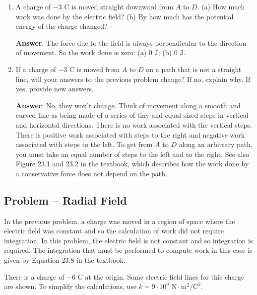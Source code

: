 \documentclass{article}
\begin{document}
\begin{enumerate}
        \vskip 48pt
        \fi

  \item A charge of $-3\text{ C}$ is moved straight downward from $A$ to $D$. (a) How much work was done by the electric field? (b) By how much has the potential energy of the charge changed?

        \ifsolutions
        {\bf Answer}: The force due to the field is always perpendicular to the direction of movement. So the work done is zero: (a) $0\text{ J}$; (b) $0 \text{ J}$.
        \else

        \vskip 48pt
        \fi

  \item If a charge of $-3\text{ C}$ is moved from $A$ to $D$ on a path that is not a straight line, will your answers to the previous problem change? If no, explain why. If yes, provide new answers.

        \ifsolutions
        {\bf Answer}: No, they won't change. Think of movement along a smooth and curved line as being made of a series of tiny and equal-sized steps in vertical and horizontal directions. There is no work associated with the vertical steps. There is positive work associated with steps to the right and negative work associated with steps to the left. To get from $A$ to $D$ along an arbitrary path, you must take an equal number of steps to the left and to the right. See also Figure 23.1 and 23.2 in the textbook, which describes how the work done by a conservative force does not depend on the path.
        \else

        \vskip 36pt
        \fi

\end{enumerate}

\newpage

\subsection{Problem -- Radial Field}

In the previous problem, a charge was moved in a region of space where the electric field was constant and so the calculation of work did not require integration. In this problem, the electric field is not constant and so integration is required. The integration that must be performed to compute work in this case is given by Equation 23.8 in the textbook.



There is a charge of $-6\text{ C}$ at the origin. Some electric field lines for this charge are shown. To simplify the calculations, use $k=9\cdot 10^9\text{ N}\cdot \text{m}^2/\text{C}^2$.
\end{document}
